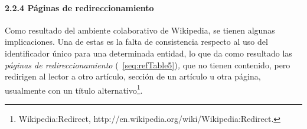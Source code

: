 \documentclass[letterpaper]{article}
\begin{document}
\bigskip

\paragraph{2.2.4 P\'aginas de redireccionamiento}

\bigskip

{\sffamily
Como resultado del ambiente colaborativo de Wikipedia, se tienen algunas
implicaciones. Una de estas es la falta de consistencia respecto al uso
del identificador \'unico para una determinada entidad, lo que da como
resultado las \textit{p\'aginas de redireccionamiento
}(\tablename~\ref{seq:refTable5})\textit{, }que no tienen contenido,
pero redirigen al lector a otro art\'iculo, secci\'on de un art\'iculo
u otra p\'agina, usualmente con un t\'itulo
alternativo\footnote{Wikipedia:Redirect,
http://en.wikipedia.org/wiki/Wikipedia:Redirect.}.}


\bigskip
\end{document}
